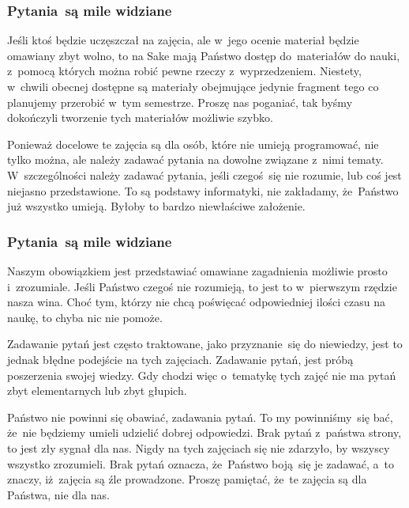 \documentclass[10pt,t]{beamer}
\begin{document}
\begin{frame}
  \frametitle{Pytania~są mile widziane}


  Jeśli ktoś będzie uczęszczał na zajęcia, ale w~jego ocenie materiał będzie
  omawiany zbyt wolno, to na Sake mają Państwo dostęp do~materiałów do
  nauki, z~pomocą których można robić pewne rzeczy z~wyprzedzeniem.
  Niestety, w~chwili obecnej dostępne są materiały obejmujące jedynie
  fragment tego co planujemy przerobić w~tym semestrze. Proszę nas poganiać,
  tak byśmy dokończyli tworzenie tych materiałów możliwie szybko.

  Ponieważ docelowe te zajęcia są dla osób, które nie umieją programować,
  nie tylko można, ale \alert{należy} zadawać pytania na dowolne związane
  z~nimi tematy. W~szczególności \alert{należy} zadawać pytania, jeśli
  czegoś~się nie rozumie, lub coś jest niejasno przedstawione. To są
  podstawy informatyki, \alert{nie} zakładamy, że~Państwo już wszystko
  umieją. Byłoby to bardzo niewłaściwe założenie.

\end{frame}





\begin{frame}
  \frametitle{Pytania~są mile widziane}


  Naszym obowiązkiem jest przedstawiać omawiane zagadnienia możliwie prosto
  i~zrozumiale. Jeśli Państwo czegoś nie rozumieją, to jest to w~pierwszym
  rzędzie nasza wina. Choć tym, którzy nie chcą poświęcać odpowiedniej
  ilości czasu na naukę, to chyba nic nie pomoże.

  Zadawanie pytań jest często traktowane, jako przyznanie~się do niewiedzy,
  jest to jednak błędne podejście na tych zajęciach. Zadawanie pytań,
  jest próbą poszerzenia swojej wiedzy. Gdy chodzi więc o~tematykę tych
  zajęć \alert{nie} ma pytań zbyt elementarnych lub zbyt głupich.

  Państwo nie powinni się obawiać, zadawania pytań. To my powinniśmy~się
  bać, że~nie będziemy umieli udzielić dobrej odpowiedzi. Brak pytań
  z~państwa strony, to jest zły sygnał dla nas. Nigdy na tych zajęciach się
  nie zdarzyło, by wszyscy wszystko zrozumieli. Brak pytań oznacza,
  że~Państwo boją~się je zadawać, a~to znaczy, iż~zajęcia są źle
  prowadzone. Proszę pamiętać, że~te zajęcia są dla Państwa, nie dla nas.

\end{frame}
\end{document}
